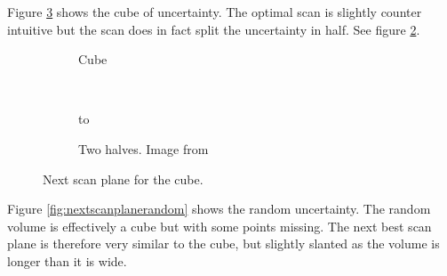 \newpage
Figure \ref{fig:nextscanplanecube} shows the cube of uncertainty. The optimal scan is slightly counter intuitive but the scan does in fact split the uncertainty in half. See figure \ref{fig:nextscanplanecubecut}.

\begin{figure}[H]
  \centering
  \begin{subfigure}[b]{0.4\textwidth}
    \usebox{\mybox}
    \caption{Cube}
    \label{fig:nextscanplanecube}  
  \end{subfigure}%
  ~ %
  \begin{subfigure}[b]{0.4\textwidth}
    \vbox to \ht{}
    \caption{Two halves. Image from \cite{cuttingupcubes}}
    \label{fig:nextscanplanecubecut}  
  \end{subfigure}  
  \caption{Next scan plane for the cube.}\label{fig:nextscanplanecube}
\end{figure}

Figure \ref{fig:nextscanplanerandom} shows the random uncertainty. The random volume is effectively a cube but with some points missing. The next best scan plane is therefore very similar to the cube, but slightly slanted as the volume is longer than it is wide.

